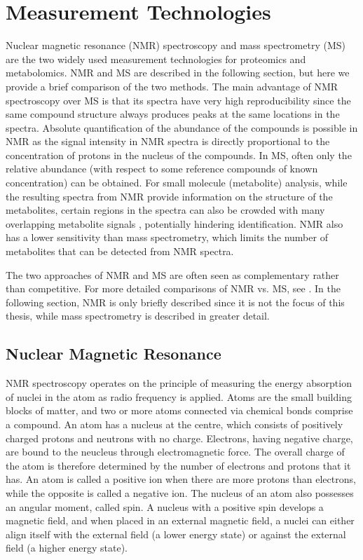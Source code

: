 \section{Measurement Technologies\label{sub:mass-spec}}

Nuclear magnetic resonance (NMR) spectroscopy and mass spectrometry (MS) are the two widely used measurement technologies for proteomics and metabolomics. NMR and MS are described in the following section, but here we provide a brief comparison of the two methods. The main advantage of NMR spectroscopy over MS is that its spectra have very high reproducibility since the same compound structure always produces peaks at the same locations in the spectra. Absolute quantification of the abundance of the compounds is possible in NMR as the signal intensity in NMR spectra is directly proportional to the concentration of protons in the nucleus of the compounds. In MS, often only the relative abundance (with respect to some reference compounds of known concentration) can be obtained. For small molecule (metabolite) analysis, while the resulting spectra from NMR provide information on the structure of the metabolites, certain regions in the spectra can also be crowded with many overlapping metabolite signals \cite{Pan2007}, potentially hindering identification. NMR also has a lower sensitivity than mass spectrometry, which limits the number of metabolites that can be detected from NMR spectra. 

The two approaches of NMR and MS are often seen as complementary rather than competitive. For more detailed comparisons of NMR vs. MS, see \cite{Pan2007}. In the following section, NMR is only briefly described since it is not the focus of this thesis, while mass spectrometry is described in greater detail.

\subsection{Nuclear Magnetic Resonance}

NMR spectroscopy operates on the principle of measuring the energy absorption of nuclei in the atom as radio frequency is applied. Atoms are the small building blocks of matter, and two or more atoms connected via chemical bonds comprise a compound. An atom has a nucleus at the centre, which consists of positively charged protons and neutrons with no charge. Electrons, having negative charge, are bound to the neucleus through electromagnetic force. The overall charge of the atom is therefore determined by the number of electrons and protons that it has. An atom is called a positive ion when there are more protons than electrons, while the opposite is called a negative ion. The nucleus of an atom also possesses an angular moment, called spin. A nucleus with a positive spin develops a magnetic field, and when placed in an external magnetic field, a nuclei can either align itself with the external field (a lower energy state) or against the external field (a higher energy state). 

